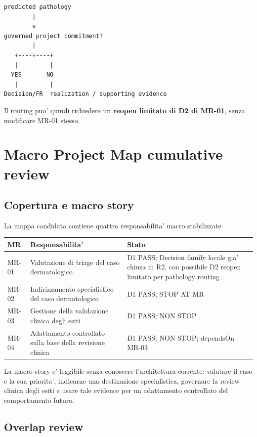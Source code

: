 \documentclass[11pt,a4paper]{article}
\begin{document}
\begin{lstlisting}
predicted pathology
        |
        v
governed project commitment?
        |
   +----+----+
   |         |
  YES       NO
   |         |
Decision/FR  realization / supporting evidence
\end{lstlisting}

Il routing puo' quindi richiedere un \textbf{reopen limitato di D2 di MR-01}, senza modificare MR-01 stesso.

\section{Macro Project Map cumulative review}

\subsection{Copertura e macro story}

La mappa candidata contiene quattro responsabilita' macro stabilizzate:

\begin{tabularx}{\textwidth}{L{24mm}L{64mm}Y}
\toprule
\textbf{MR} & \textbf{Responsabilita'} & \textbf{Stato} \\
\midrule
MR-01 & Valutazione di triage del caso dermatologico & D1 PASS; Decision family locale gia' chiusa in R2, con possibile D2 reopen limitato per pathology routing \\
MR-02 & Indirizzamento specialistico del caso dermatologico & D1 PASS; STOP AT MR \\
MR-03 & Gestione della validazione clinica degli esiti & D1 PASS; NON STOP \\
MR-04 & Adattamento controllato sulla base della revisione clinica & D1 PASS; NON STOP; dependsOn MR-03 \\
\bottomrule
\end{tabularx}

La macro story e' leggibile senza conoscere l'architettura corrente: valutare il caso e la sua priorita', indicarne una destinazione specialistica, governare la review clinica degli esiti e usare tale evidence per un adattamento controllato del comportamento futuro.

\subsection{Overlap review}
\end{document}
